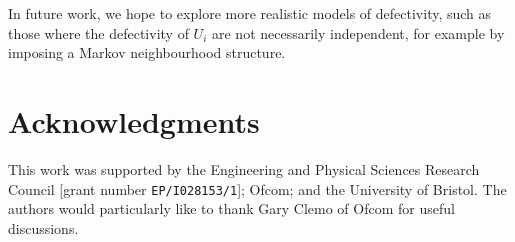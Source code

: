 \documentclass[conference]{IEEEtran}
\begin{document}
In future work, we hope to explore more realistic models of defectivity, such as those where the defectivity of $U_i$ are not
necessarily independent, for example by imposing a Markov neighbourhood structure.

\section*{Acknowledgments}

This work was supported by the Engineering and Physical Sciences Research Council [grant number {\tt EP/I028153/1}]; Ofcom; and the University of Bristol. The authors would particularly like to thank Gary Clemo of Ofcom for useful discussions.


\end{document}
